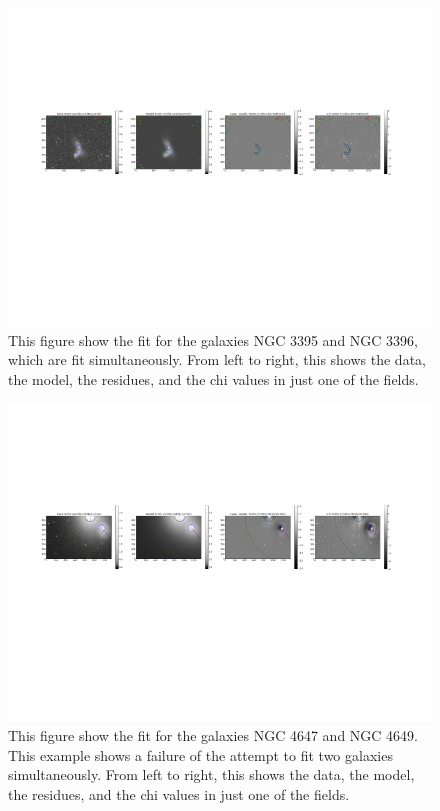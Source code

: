 \documentclass[12pt,preprint,pdftex]{aastex}
\begin{document}
\begin{figure}
\centering
\includegraphics[trim = .9cm 4.5cm 1.15cm 2.9cm,clip=true,width=\textwidth] {gooddouble.pdf}
\caption{This figure show the fit for the galaxies NGC 3395 and NGC
 3396, which are fit simultaneously. From left to right, this shows
 the data, the model, the residues, and the chi values in just one of
 the fields.}
\label{fig:gooddouble}
\end{figure}

\begin{figure}
\centering
\includegraphics[trim = .9cm 4.5cm 1.15cm 2.9cm,clip=true,width=\textwidth] {baddouble.pdf}
\caption{This figure show the fit for the galaxies NGC 4647 and NGC
 4649. This example shows a failure of the attempt to fit two galaxies
 simultaneously. From left to right, this shows the data, the model,
 the residues, and the chi values in just one of the fields.}
\label{fig:baddouble}
\end{figure}
\end{document}
